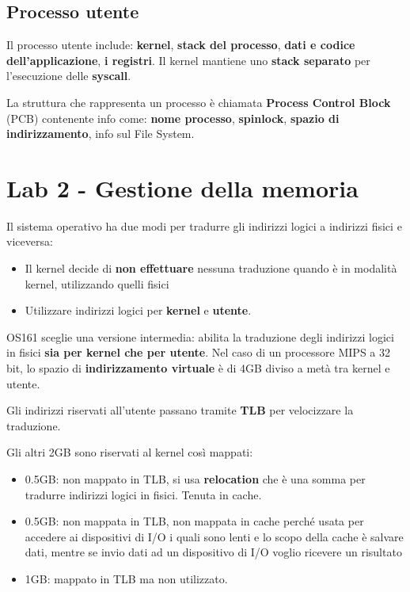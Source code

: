\subsection{Processo utente}

Il processo utente include: \textbf{kernel}, \textbf{stack del processo}, \textbf{dati e codice dell'applicazione}, \textbf{i registri}.
Il kernel mantiene uno \textbf{stack separato} per l'esecuzione delle \textbf{syscall}.

La struttura che rappresenta un processo è chiamata \textbf{Process Control Block} (PCB) contenente info come:
\textbf{nome processo}, \textbf{spinlock}, \textbf{spazio di indirizzamento}, info sul File System.

\section{Lab 2 - Gestione della memoria}

Il sistema operativo ha due modi per  tradurre gli indirizzi logici a indirizzi fisici e viceversa:

\begin{itemize}
  \item Il kernel decide di \textbf{non effettuare} nessuna traduzione quando è in modalità kernel, utilizzando quelli fisici
  \item Utilizzare indirizzi logici per \textbf{kernel} e \textbf{utente}.
\end{itemize}

OS161 sceglie una versione intermedia: abilita la traduzione degli indirizzi logici in fisici \textbf{sia per kernel che per utente}.
Nel caso di un processore MIPS a 32 bit, lo spazio di \textbf{indirizzamento virtuale} è di 4GB diviso a metà tra kernel e utente.

Gli indirizzi riservati all'utente passano tramite \textbf{TLB} per velocizzare la traduzione.

Gli altri 2GB sono riservati al kernel così mappati:

\begin{itemize}
  \item 0.5GB: non mappato in TLB, si usa \textbf{relocation} che è una somma per tradurre indirizzi logici in fisici. Tenuta in cache.
  \item 0.5GB: non mappata in TLB, non mappata in cache perché usata per accedere ai dispositivi di I/O i quali sono lenti e lo scopo della cache è
        salvare dati, mentre se invio dati ad un dispositivo di I/O voglio ricevere un risultato
  \item 1GB: mappato in TLB ma non utilizzato.
\end{itemize}


